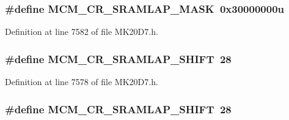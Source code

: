 \subsubsection[{\texorpdfstring{M\+C\+M\+\_\+\+C\+R\+\_\+\+S\+R\+A\+M\+L\+A\+P\+\_\+\+M\+A\+SK}{MCM_CR_SRAMLAP_MASK}}]{\setlength{\rightskip}{0pt plus 5cm}\#define M\+C\+M\+\_\+\+C\+R\+\_\+\+S\+R\+A\+M\+L\+A\+P\+\_\+\+M\+A\+SK~0x30000000u}\hypertarget{group___m_c_m___register___masks_gad9a5f5487e03cefac1a4798ccce630bc}{}\label{group___m_c_m___register___masks_gad9a5f5487e03cefac1a4798ccce630bc}


Definition at line 7582 of file M\+K20\+D7.\+h.

\subsubsection[{\texorpdfstring{M\+C\+M\+\_\+\+C\+R\+\_\+\+S\+R\+A\+M\+L\+A\+P\+\_\+\+S\+H\+I\+FT}{MCM_CR_SRAMLAP_SHIFT}}]{\setlength{\rightskip}{0pt plus 5cm}\#define M\+C\+M\+\_\+\+C\+R\+\_\+\+S\+R\+A\+M\+L\+A\+P\+\_\+\+S\+H\+I\+FT~28}\hypertarget{group___m_c_m___register___masks_ga083d0b4e4188e656d92bfa8fb9b4eca9}{}\label{group___m_c_m___register___masks_ga083d0b4e4188e656d92bfa8fb9b4eca9}


Definition at line 7578 of file M\+K20\+D7.\+h.

\subsubsection[{\texorpdfstring{M\+C\+M\+\_\+\+C\+R\+\_\+\+S\+R\+A\+M\+L\+A\+P\+\_\+\+S\+H\+I\+FT}{MCM_CR_SRAMLAP_SHIFT}}]{\setlength{\rightskip}{0pt plus 5cm}\#define M\+C\+M\+\_\+\+C\+R\+\_\+\+S\+R\+A\+M\+L\+A\+P\+\_\+\+S\+H\+I\+FT~28}\hypertarget{group___m_c_m___register___masks_ga083d0b4e4188e656d92bfa8fb9b4eca9}{}\label{group___m_c_m___register___masks_ga083d0b4e4188e656d92bfa8fb9b4eca9}



